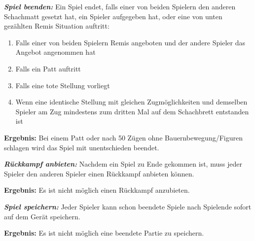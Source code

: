 \documentclass[parskip=full]{scrartcl}
\begin{document}
\begin{description}
	\item[F3060] \textbf{\textit{Spiel beenden: }} Ein Spiel endet, falls einer von beiden Spielern den anderen Schachmatt gesetzt hat, ein Spieler aufgegeben hat, oder eine von unten gezählten Remis Situation auftritt:
	\begin{enumerate}	    
		\item Falls einer von beiden Spielern Remis angeboten und der andere Spieler das Angebot angenommen hat
		\item Falls ein Patt auftritt
		\item Falls eine tote Stellung vorliegt
		\item Wenn eine identische Stellung mit gleichen Zugmöglichkeiten und demselben Spieler am Zug mindestens zum dritten Mal auf dem Schachbrett entstanden ist 
	\end{enumerate}
	\item \textbf{Ergebnis: } Bei einem Patt oder nach 50 Zügen ohne Bauernbewegung/Figuren schlagen wird das Spiel mit unentschieden beendet.
	
	\item[F3070] \textbf{\textit{Rückkampf anbieten: }} Nachdem ein Spiel zu Ende gekommen ist, muss jeder Spieler den anderen Spieler einen Rückkampf anbieten können.	
	\item \textbf{Ergebnis: } Es ist nicht möglich einen Rückkampf anzubieten.
		
	\item[F3080] \textbf{\textit{Spiel speichern: }}  Jeder Spieler kann schon beendete Spiele nach Spielende sofort auf dem Gerät speichern. 
	\item \textbf{Ergebnis: } Es ist nicht möglich eine beendete Partie zu speichern.
	
\end{description}
\end{document}

